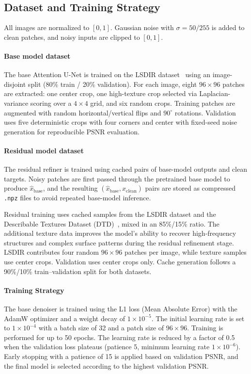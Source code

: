 \documentclass[10pt,twocolumn,letterpaper]{article}
\begin{document}
\subsection{Dataset and Training Strategy}

All images are normalized to $[0,1]$. Gaussian noise with $\sigma=50/255$ is added to clean patches, and noisy inputs are clipped to $[0,1]$.

\paragraph{Base model dataset}
The base Attention U-Net is trained on the LSDIR dataset~\cite{li2023lsdir} using an image-disjoint split (80\% train / 20\% validation). For each image, eight $96\times96$ patches are extracted: one center crop, one high-texture crop selected via Laplacian-variance scoring over a $4\times4$ grid, and six random crops. Training patches are augmented with random horizontal/vertical flips and $90^\circ$ rotations. Validation uses five deterministic crops with four corners and center with fixed-seed noise generation for reproducible PSNR evaluation.

\paragraph{Residual model dataset}
The residual refiner is trained using cached pairs of base-model outputs and clean targets. Noisy patches are first passed through the pretrained base model to produce $\hat{x}_{\text{base}}$, and the resulting $(\hat{x}_{\text{base}}, x_{\text{clean}})$ pairs are stored as compressed \texttt{.npz} files to avoid repeated base-model inference.

\noindent Residual training uses cached samples from the LSDIR dataset and the Describable Textures Dataset (DTD)~\cite{cimpoi14describing}, mixed in an 85\%/15\% ratio. The additional texture data improves the model’s ability to recover high-frequency structures and complex surface patterns during the residual refinement stage. LSDIR contributes four random $96\times96$ patches per image, while texture samples use center crops. Validation uses center crops only. Cache generation follows a 90\%/10\% train–validation split for both datasets.

\paragraph{Training Strategy}
The base denoiser is trained using the L1 loss (Mean Absolute Error) with the AdamW optimizer and a weight decay of $1\times10^{-5}$. The initial learning rate is set to $1\times10^{-4}$ with a batch size of 32 and a patch size of $96\times96$. Training is performed for up to 50 epochs. The learning rate is reduced by a factor of 0.5 when the validation loss plateaus (patience 5, minimum learning rate $1\times10^{-6}$). Early stopping with a patience of 15 is applied based on validation PSNR, and the final model is selected according to the highest validation PSNR.\\
\end{document}
